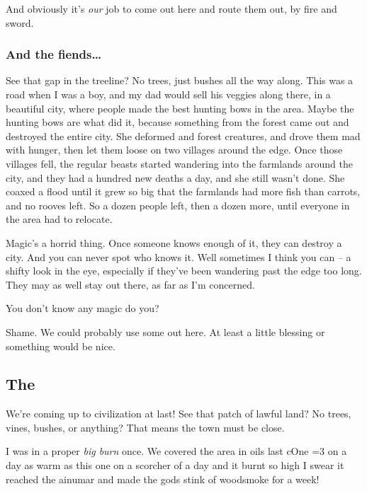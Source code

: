 \begin{multicols}{2}
\begin{exampletext}
  And obviously it's \emph{our} job to come out here and route them out, by fire and sword.

  \subsubsection*{And the fiends\ldots}

  See that gap in the treeline?
  No trees, just bushes all the way along.
  This was a road when I was a boy, and my dad would sell his veggies along there, in a beautiful city, where people made the best hunting bows in the area.
  Maybe the hunting bows are what did it, because something from the forest came out and destroyed the entire city.
  She deformed and forest creatures, and drove them mad with hunger, then let them loose on two \glspl{village} around the \gls{edge}.
  Once those \glspl{village} fell, the regular beasts started wandering into the farmlands around the city, and they had a hundred new deaths a day, and she still wasn't done.
  She coaxed a flood until it grew so big that the farmlands had more fish than carrots, and no rooves left.
  So a dozen people left, then a dozen more, until everyone in the area had to relocate.

  Magic's a horrid thing.
  Once someone knows enough of it, they can destroy a city.
  And you can never spot who knows it.
  Well sometimes I think you can -- a shifty look in the eye, especially if they've been wandering past the \gls{edge} too long.
  They may as well stay out there, as far as I'm concerned.

  You don't know any magic do you?

  Shame.
  We could probably use some out here.
  At least a little blessing or something would be nice.

\subsection*{The }

  We're coming up to civilization at last!
  See that patch of lawful land?
  No trees, vines, bushes, or anything?
  That means the town must be close.

  I was in a proper \textit{big burn} once.
  We covered the area in oils last \gls{cOne} \ifnum\value{temperature}=3 on a day as warm as this one \else on a scorcher of a day \fi and it burnt so high I swear it reached the \gls{ainumar} and made the gods stink of woodsmoke for a week!


\end{exampletext}
\end{multicols}

